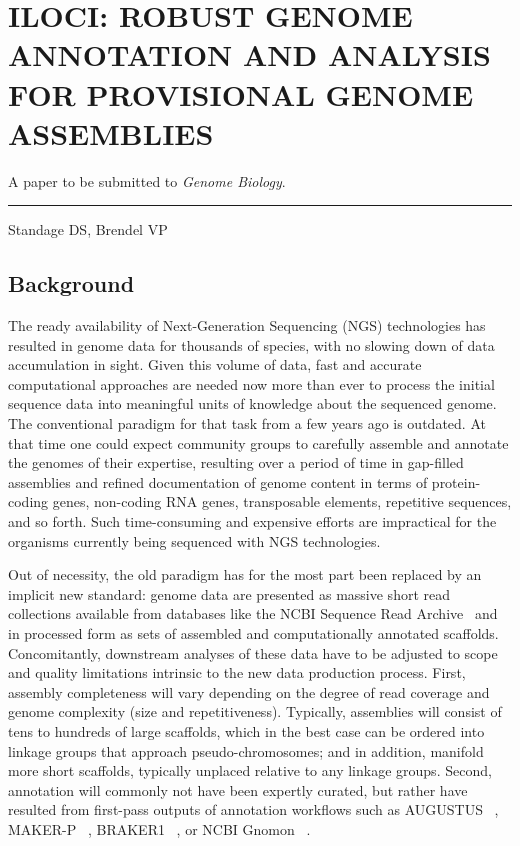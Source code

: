 \chapter{ILOCI: ROBUST GENOME ANNOTATION AND ANALYSIS FOR PROVISIONAL GENOME ASSEMBLIES}

A paper to be submitted to \textit{Genome Biology}.

\noindent\hfil\rule{0.5\textwidth}{.4pt}\hfil

Standage DS, Brendel VP

\section*{Background}

The ready availability of Next-Generation Sequencing (NGS) technologies has resulted in genome data for thousands of species, with no slowing down of data accumulation in sight.
Given this volume of data, fast and accurate computational approaches are needed now more than ever to process the initial sequence data into meaningful units of knowledge about the sequenced genome.
The conventional paradigm for that task from a few years ago is outdated.
At that time one could expect community groups to carefully assemble and annotate the genomes of their expertise, resulting over a period of time in gap-filled assemblies and refined documentation of genome content in terms of protein-coding genes, non-coding RNA genes, transposable elements, repetitive sequences, and so forth.
Such time-consuming and expensive efforts are impractical for the organisms currently being sequenced with NGS technologies.

Out of necessity, the old paradigm has for the most part been replaced by an implicit new standard:  genome data are presented as massive short read  collections available from databases like the NCBI Sequence Read Archive~ \cite{SRA} and in processed form as sets of assembled and computationally annotated scaffolds.
Concomitantly, downstream analyses of these data have to be adjusted to  scope and quality limitations intrinsic to the new data production process.
First, assembly completeness will vary depending on the degree of read coverage and genome complexity (size and repetitiveness).
Typically, assemblies will consist of tens to hundreds of large scaffolds, which in the best case can be ordered into linkage groups that approach pseudo-chromosomes; and in addition, manifold more short scaffolds, typically unplaced relative to any linkage groups.
Second, annotation will commonly not have been expertly curated, but rather have resulted from first-pass outputs of annotation workflows such as AUGUSTUS~ \cite{AUGUSTUS}, MAKER-P~ \cite{MAKERP}, BRAKER1~ \cite{BRAKER1}, or NCBI Gnomon~ \cite{Gnomon}.

